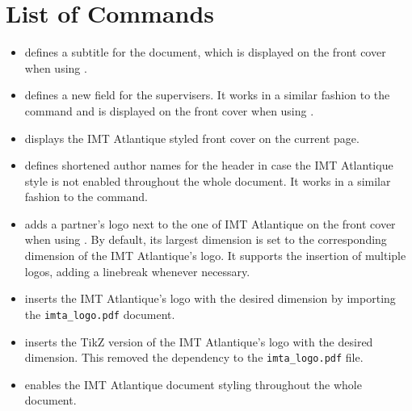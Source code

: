 \documentclass{report}
\begin{document}
\section{List of Commands}
\begin{itemize}
    \item {} defines a subtitle for the document, which is displayed on the front cover when using .
    
    \item {} defines a new field for the supervisers. It works in a similar fashion to the  command and is displayed on the front cover when using .
    
    \item {} displays the IMT Atlantique styled front cover on the current page.
    
    \item {} defines shortened author names for the header in case the IMT Atlantique style is not enabled throughout the whole document. It works in a similar fashion to the  command.
    
    \item {} adds a partner's logo next to the one of IMT Atlantique on the front cover when using . By default, its largest dimension is set to the corresponding dimension of the IMT Atlantique's logo. It supports the insertion of multiple logos, adding a linebreak whenever necessary.
    
    \item {} inserts the IMT Atlantique's logo with the desired dimension by importing the \texttt{imta\_logo.pdf} document.
    
    \item {} inserts the TikZ version of the IMT Atlantique's logo with the desired dimension. This removed the dependency to the \texttt{imta\_logo.pdf} file.
    
    \item {} enables the IMT Atlantique document styling throughout the whole document.
    

\end{itemize}
\end{document}
